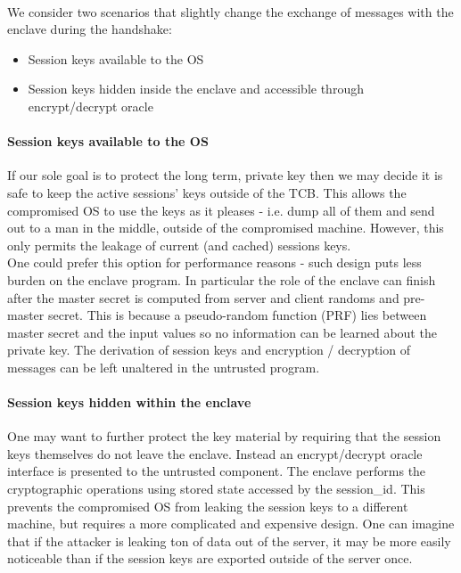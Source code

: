 \documentclass[../main.tex]{subfiles}
\begin{document}
\noindent
\\We consider two scenarios that slightly change the exchange of messages with the enclave during the handshake:
\begin{itemize}
	\item Session keys available to the OS
	\item Session keys hidden inside the enclave and accessible through
	encrypt/decrypt oracle
\end{itemize}



\paragraph{Session keys available to the OS}

If our sole goal is to protect the long term, private key then we may decide
it is safe to keep the active sessions' keys outside of the TCB. This allows
the compromised OS to use the keys as it pleases - i.e. dump all of them and
send out to a man in the middle, outside of the compromised machine. However,
this only permits the leakage of current (and cached) sessions keys.\\

\noindent
One could prefer this option for performance reasons - such design puts less
burden on the enclave program. In particular the role of the enclave can
finish after the master secret is computed from server and client randoms and
pre-master secret. This is because a pseudo-random function (PRF) lies between
master secret and the input values so no information can be learned about the
private key. The derivation of session keys and encryption / decryption of
messages can be left unaltered in the untrusted program.

\paragraph{Session keys hidden within the enclave}

One may want to further protect the key material by requiring that the session
keys themselves do not leave the enclave. Instead an encrypt/decrypt oracle
interface is presented to the untrusted component. The enclave performs the
cryptographic operations using stored state accessed by the session\_id. This
prevents the compromised OS from leaking the session keys to a different
machine, but requires a more complicated and expensive design.
One can imagine that if the attacker is leaking ton of data out of the server,
it may be more easily noticeable than if the session keys are exported outside of the server once.\\
\end{document}
